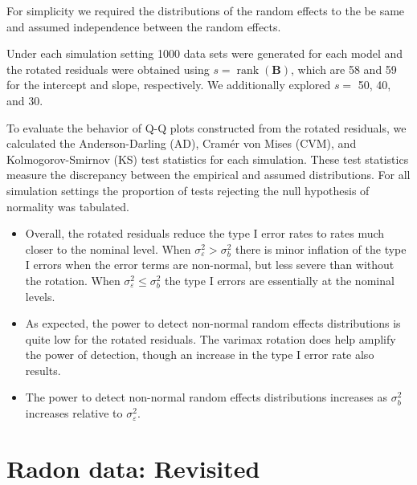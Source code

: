 \documentclass{article} %
\DeclareMathOperator{\rank}{rank}
\begin{document}
%
For simplicity we required the distributions of the random effects to the be same and assumed independence between the random effects. 

Under each simulation setting 1000 data sets were generated for each model and the rotated residuals were obtained using $s = \rank(\bm{B})$, which are 58 and 59 for the intercept and slope, respectively. We additionally explored $s =$ 50, 40, and 30.

To evaluate the behavior of Q-Q plots constructed from the rotated residuals, we calculated the Anderson-Darling (AD), Cram{\'e}r von Mises (CVM), and Kolmogorov-Smirnov (KS) test statistics for each simulation. These test statistics measure the discrepancy between the empirical and assumed distributions. For all simulation settings the proportion of tests rejecting the null hypothesis of normality was tabulated. 



\begin{itemize}
\item Overall, the rotated residuals reduce the type I error rates to rates much closer to the nominal level. When $\sigma^2_\varepsilon > \sigma^2_b$ there is minor inflation of the type I errors when the error terms are non-normal, but less severe than without the rotation. When $\sigma^2_\varepsilon \leq \sigma^2_b$ the type I errors are essentially at the nominal levels.

\item As expected, the power to detect non-normal random effects distributions is quite low for the rotated residuals. The varimax rotation does help amplify the power of detection, though an increase in the type I error rate also results.

\item The power to detect non-normal random effects distributions increases as $\sigma^2_b$ increases relative to $\sigma^2_\varepsilon$.



\end{itemize}

\section{Radon data: Revisited}\label{sec:radon2}
\end{document}
